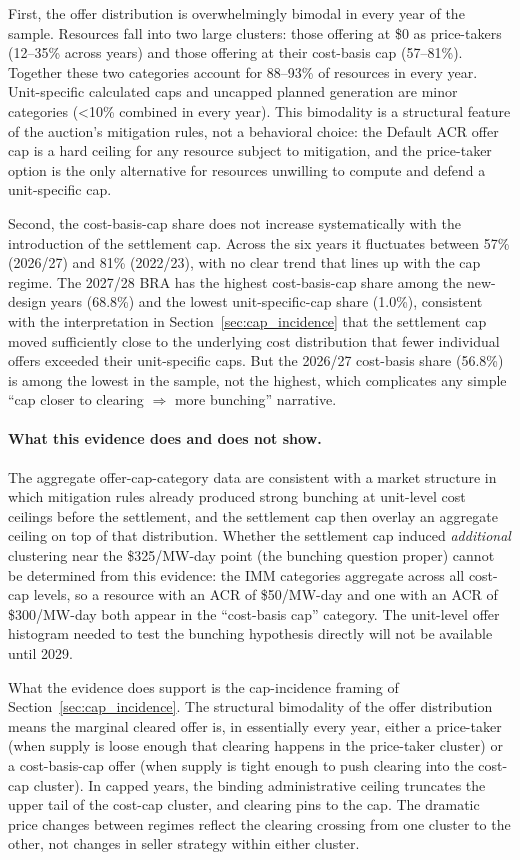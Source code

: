 First, the offer distribution is overwhelmingly bimodal in every year
of the sample. Resources fall into two large clusters: those offering
at \$0 as price-takers (12--35\% across years) and those offering at
their cost-basis cap (57--81\%). Together these two categories account
for 88--93\% of resources in every year. Unit-specific calculated caps
and uncapped planned generation are minor categories
(\textless10\% combined in every year). This bimodality is a structural
feature of the auction's mitigation rules, not a behavioral choice: the
Default ACR offer cap is a hard ceiling for any resource subject to
mitigation, and the price-taker option is the only alternative for
resources unwilling to compute and defend a unit-specific cap.

Second, the cost-basis-cap share does not increase systematically with
the introduction of the settlement cap. Across the six years it
fluctuates between 57\% (2026/27) and 81\% (2022/23), with no clear
trend that lines up with the cap regime. The 2027/28 BRA has the
highest cost-basis-cap share among the new-design years (68.8\%) and
the lowest unit-specific-cap share (1.0\%), consistent with the
interpretation in Section~\ref{sec:cap_incidence} that the settlement
cap moved sufficiently close to the underlying cost distribution that
fewer individual offers exceeded their unit-specific caps. But the
2026/27 cost-basis share (56.8\%) is among the lowest in the sample,
not the highest, which complicates any simple ``cap closer to clearing
$\Rightarrow$ more bunching'' narrative.

\paragraph{What this evidence does and does not show.} The aggregate
offer-cap-category data are consistent with a market structure in
which mitigation rules already produced strong bunching at unit-level
cost ceilings before the settlement, and the settlement cap then
overlay an aggregate ceiling on top of that distribution. Whether the
settlement cap induced \emph{additional} clustering near the
\$325/MW-day point (the bunching question proper) cannot be determined
from this evidence: the IMM categories aggregate across all cost-cap
levels, so a resource with an ACR of \$50/MW-day and one with an ACR
of \$300/MW-day both appear in the ``cost-basis cap'' category. The
unit-level offer histogram needed to test the bunching hypothesis
directly will not be available until 2029.

What the evidence does support is the cap-incidence framing of
Section~\ref{sec:cap_incidence}. The structural bimodality of the
offer distribution means the marginal cleared offer is, in essentially
every year, either a price-taker (when supply is loose enough that
clearing happens in the price-taker cluster) or a cost-basis-cap
offer (when supply is tight enough to push clearing into the cost-cap
cluster). In capped years, the binding administrative ceiling
truncates the upper tail of the cost-cap cluster, and clearing pins
to the cap. The dramatic price changes between regimes reflect the
clearing crossing from one cluster to the other, not changes in
seller strategy within either cluster.
